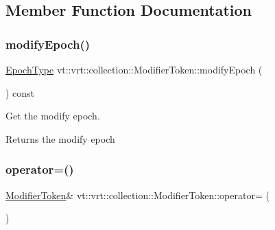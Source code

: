 \subsection{Member Function Documentation}
\mbox{\label{structvt_1_1vrt_1_1collection_1_1_modifier_token_a2a87237f09095f3284a5ebea7b9976e9}} 
\subsubsection{\texorpdfstring{modify\+Epoch()}{modifyEpoch()}}
{\footnotesize\ttfamily \hyperlink{namespacevt_a81d11b28122d43bf9834577e4a06440f}{Epoch\+Type} vt\+::vrt\+::collection\+::\+Modifier\+Token\+::modify\+Epoch (\begin{DoxyParamCaption}{ }\end{DoxyParamCaption}) const\hspace{0.3cm}{\ttfamily [inline]}}



Get the modify epoch. 

\begin{DoxyReturn}{Returns}
the modify epoch 
\end{DoxyReturn}
\mbox{\label{structvt_1_1vrt_1_1collection_1_1_modifier_token_ae5bb7550e56586506bf2823603023109}} 
\subsubsection{\texorpdfstring{operator=()}{operator=()}\hspace{0.1cm}{\footnotesize\ttfamily [1/2]}}
{\footnotesize\ttfamily \hyperlink{structvt_1_1vrt_1_1collection_1_1_modifier_token}{Modifier\+Token}\& vt\+::vrt\+::collection\+::\+Modifier\+Token\+::operator= (\begin{DoxyParamCaption}\item[{\hyperlink{structvt_1_1vrt_1_1collection_1_1_modifier_token}{Modifier\+Token} const \&}]{ }\end{DoxyParamCaption})\hspace{0.3cm}{\ttfamily [delete]}}

